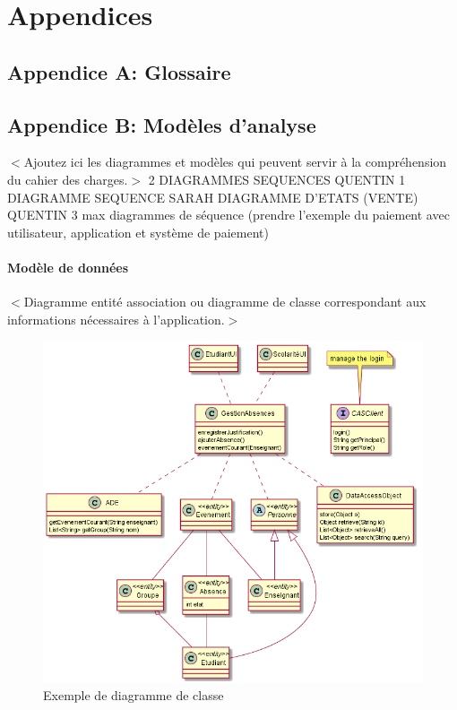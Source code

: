 \chapter{Appendices}
\section{Appendice A: Glossaire}
\printglossaries

\section{Appendice B: Modèles d'analyse}
$<$Ajoutez ici les diagrammes et modèles qui peuvent servir à la compréhension du cahier des charges.$>$
2 DIAGRAMMES SEQUENCES QUENTIN
1 DIAGRAMME SEQUENCE SARAH
DIAGRAMME D'ETATS (VENTE) QUENTIN
3 max diagrammes de séquence (prendre l'exemple du paiement avec utilisateur, application et système de paiement)

\subsubsection{Modèle de données}
$<$Diagramme entité association ou diagramme de classe correspondant aux informations nécessaires à l'application.$>$

\begin{figure}
\includegraphics[width=\textwidth]{"AbsencesClasses"}
\caption{Exemple de diagramme de classe}
\end{figure}

